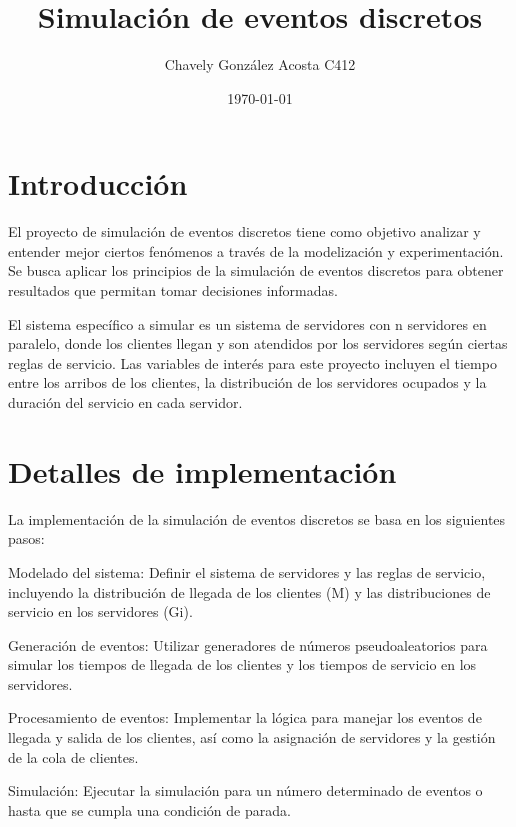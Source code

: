 \documentclass[article]{amsart}
\begin{document}
\thispagestyle{empty}
\title{
	Simulaci\'on de eventos discretos
}
\author{Chavely Gonz\'alez Acosta C412}
\date{\today}
\maketitle
{}

\newpage


\tableofcontents

\pagestyle{fancy}
\newpage

\section{Introducci\'on}
El proyecto de simulación de eventos discretos tiene como objetivo analizar y entender mejor ciertos fenómenos a través de la modelización y experimentación. Se busca aplicar los principios de la simulación de eventos discretos para obtener resultados que permitan tomar decisiones informadas.

El sistema específico a simular es un sistema de servidores con n servidores en paralelo, donde los clientes llegan y son atendidos por los servidores según ciertas reglas de servicio. Las variables de interés para este proyecto incluyen el tiempo entre los arribos de los clientes, la distribución de los servidores ocupados y la duración del servicio en cada servidor.

\section{Detalles de implementaci\'on}
La implementación de la simulación de eventos discretos se basa en los siguientes pasos:

    Modelado del sistema: Definir el sistema de servidores y las reglas de servicio, incluyendo la distribución de llegada de los clientes (M) y las distribuciones de servicio en los servidores (Gi).

    Generación de eventos: Utilizar generadores de números pseudoaleatorios para simular los tiempos de llegada de los clientes y los tiempos de servicio en los servidores.

    Procesamiento de eventos: Implementar la lógica para manejar los eventos de llegada y salida de los clientes, así como la asignación de servidores y la gestión de la cola de clientes.

    Simulación: Ejecutar la simulación para un número determinado de eventos o hasta que se cumpla una condición de parada.
\end{document}
